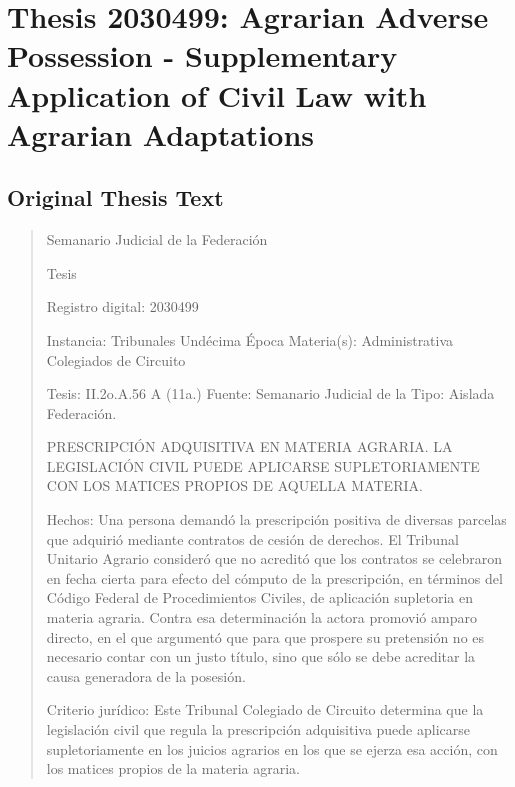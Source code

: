 \documentclass[11pt,a4paper]{article}
\begin{document}
\newpage

\section{Thesis 2030499: Agrarian Adverse Possession - Supplementary Application of Civil Law with Agrarian Adaptations}
\label{thesis:2030499}

\subsection{Original Thesis Text}

\begin{quote}
                                                   Semanario Judicial de la Federación

                                                Tesis

 Registro digital: 2030499

 Instancia: Tribunales             Undécima Época                         Materia(s): Administrativa
 Colegiados de Circuito

 Tesis: II.2o.A.56 A (11a.)        Fuente: Semanario Judicial de la       Tipo: Aislada
                                   Federación.


PRESCRIPCIÓN ADQUISITIVA EN MATERIA AGRARIA. LA LEGISLACIÓN CIVIL PUEDE
APLICARSE SUPLETORIAMENTE CON LOS MATICES PROPIOS DE AQUELLA MATERIA.


Hechos: Una persona demandó la prescripción positiva de diversas parcelas que adquirió mediante
contratos de cesión de derechos. El Tribunal Unitario Agrario consideró que no acreditó que los
contratos se celebraron en fecha cierta para efecto del cómputo de la prescripción, en términos del
Código Federal de Procedimientos Civiles, de aplicación supletoria en materia agraria. Contra esa
determinación la actora promovió amparo directo, en el que argumentó que para que prospere su
pretensión no es necesario contar con un justo título, sino que sólo se debe acreditar la causa
generadora de la posesión.

Criterio jurídico: Este Tribunal Colegiado de Circuito determina que la legislación civil que regula la
prescripción adquisitiva puede aplicarse supletoriamente en los juicios agrarios en los que se ejerza
esa acción, con los matices propios de la materia agraria.


\end{quote}
\end{document}
